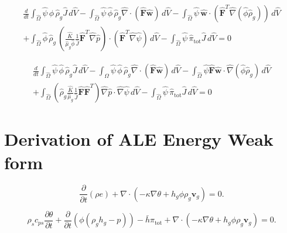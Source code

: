 \documentclass[11pt]{article}
\begin{document}
\begin{multline}
\frac{d}{dt} \int_{\widehat{\Omega}} \widehat{\psi}\,\widehat{\phi}\,\widehat{\rho}_g \widehat{J} \,d\widehat{V}
- \int_{\widehat{\Omega}} \widehat{\psi}\,\widehat{\phi}\,\widehat{\rho}_g
\widehat{\nabla}\cdot\left(\widehat{\mathbf{F}} \widehat{\mathbf{w}}\right) \,d\widehat{V}
- \int_{\widehat{\Omega}} \widehat{\psi}\,\widehat{\mathbf{w}}\cdot
\left(\widehat{\mathbf{F}}^{T} \widehat{\nabla}\left(\widehat{\phi} \widehat{\rho}_g\right)\right) \,d\widehat{V}
\\
+ \int_{\widehat{\Omega}} \widehat{\phi}\,\widehat{\rho}_g\,
\left(
\frac{\widehat{K}}{\widehat{\mu}_g \widehat{\phi}} \frac{1}{\widehat{J}} \widehat{\mathbf{F}}^{T} \widehat{\nabla} \widehat{p}
\right) \cdot
\left( \widehat{\mathbf{F}}^{T}\widehat{\nabla}\widehat{\psi}\right) \,d\widehat{V}
- \int_{\widehat{\Omega}} \widehat{\psi}\,\widehat{\pi}_{\mathrm{tot}} \widehat{J} \,d\widehat{V}
= 0
\end{multline}

\begin{multline}
\frac{d}{dt} \int_{\widehat{\Omega}} \widehat{\psi}\,\widehat{\phi}\,\widehat{\rho}_g \widehat{J} \,d\widehat{V}
- \int_{\widehat{\Omega}} \widehat{\psi}\,\widehat{\phi}\,\widehat{\rho}_g
\widehat{\nabla}\cdot\left(\widehat{\mathbf{F}} \widehat{\mathbf{w}}\right) \,d\widehat{V}
- \int_{\widehat{\Omega}} \widehat{\psi} \widehat{\mathbf{F}} \widehat{\mathbf{w}}\cdot
\widehat{\nabla}\left(\widehat{\phi} \widehat{\rho}_g\right) \,d\widehat{V}
\\
+ \int_{\widehat{\Omega}} \left( \widehat{\rho}_g \frac{\widehat{K}}{\widehat{\mu}_g } \frac{1}{\widehat{J}} \widehat{\mathbf{F}} \widehat{\mathbf{F}}^{T} \right) \widehat{\nabla} \widehat{p} \cdot \widehat{\nabla}\widehat{\psi} \,d\widehat{V}
- \int_{\widehat{\Omega}} \widehat{\psi}\,\widehat{\pi}_{\mathrm{tot}} \widehat{J} \,d\widehat{V}
= 0
\end{multline}

\section{Derivation of ALE Energy Weak form}

\begin{equation}
\frac{\partial }{\partial t} \left( \rho e \right)
+ \nabla \cdot
\left(
 -\kappa\nabla \theta + h_g \phi \rho_{g} \mathbf{v}_{g}
\right)
= 0.
\end{equation}

\begin{equation}
\rho_{s} c_{ps} \frac{\partial \theta}{\partial t}
+ \frac{\partial}{\partial t} \left( \phi(\rho_g h_g - p) \right)
- \bar{h} \pi_{\mathrm{tot}}
+ \nabla \cdot
\left(
 -\kappa\nabla \theta + h_g \phi \rho_{g} \mathbf{v}_{g}
\right)
= 0.
\end{equation}
\end{document}
